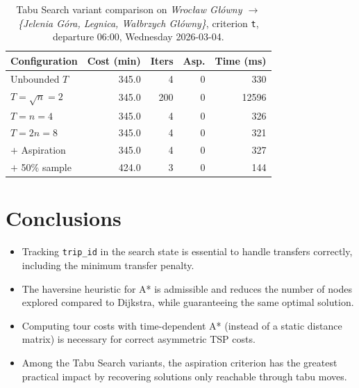 \documentclass[12pt,a4paper]{article}
\begin{document}
\begin{table}[H]
\centering
\begin{tabular}{lrrrr}
\toprule
\textbf{Configuration} & \textbf{Cost (min)} & \textbf{Iters} & \textbf{Asp.} & \textbf{Time (ms)} \\
\midrule
Unbounded $T$       & 345.0 &   4 & 0 &   330 \\
$T = \sqrt{n} = 2$  & 345.0 & 200 & 0 & 12596 \\
$T = n = 4$         & 345.0 &   4 & 0 &   326 \\
$T = 2n = 8$        & 345.0 &   4 & 0 &   321 \\
$+$ Aspiration      & 345.0 &   4 & 0 &   327 \\
$+$ 50\% sample     & 424.0 &   3 & 0 &   144 \\
\bottomrule
\end{tabular}
\caption{Tabu Search variant comparison on
         \textit{Wrocław Główny $\to$ \{Jelenia Góra, Legnica, Wałbrzych Główny\}},
         criterion \texttt{t}, departure 06:00, Wednesday 2026-03-04.}
\end{table}

\section{Conclusions}

\begin{itemize}
  \item Tracking \texttt{trip\_id} in the search state is essential to handle
        transfers correctly, including the minimum transfer penalty.

  \item The haversine heuristic for A* is admissible and reduces the number of
        nodes explored compared to Dijkstra, while guaranteeing the same
        optimal solution.

  \item Computing tour costs with time-dependent A* (instead of a static
        distance matrix) is necessary for correct asymmetric TSP costs.

  \item Among the Tabu Search variants, the aspiration criterion has the
        greatest practical impact by recovering solutions only reachable
        through tabu moves.
\end{itemize}
\end{document}
